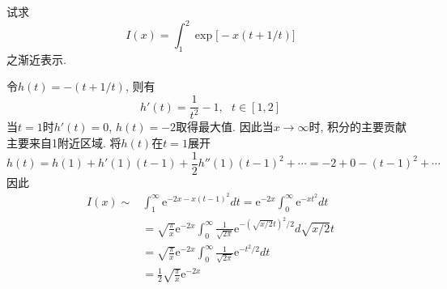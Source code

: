 \begin{problem}[习题2.5]
试求
\[
I(x)=\int_1^2\exp\Big[
-x(t+1/t)\Big]
\]
之渐近表示.
\end{problem}

\begin{solution}
令$h(t)=-(t+1/t)$, 则有
\[
h'(t)=\frac{1}{t^{2}}-1,\:\:\: t\in[1,2]
\]
当$t=1$时$h'(t)=0$, $h(t)=-2$取得最大值. 因此当$x\rightarrow\infty$时, 积分的主要贡献主要来自1附近区域.
将$h(t)$在$t=1$展开
\[
h(t)=h(1)+h'(1)(t-1)+\frac{1}{2}h''(1)(t-1)^{2}+\cdots=-2+0-(t-1)^{2}+\cdots
\]
因此
\begin{align*}
I(x)\sim & \int_{1}^{\infty}\mathrm{e}^{-2x-x(t-1)^{2}}dt=\mathrm{e}^{-2x}\int_{0}^{\infty}\mathrm{e}^{-xt^{2}}dt\\
 & =\sqrt{\frac{\pi}{x}}\mathrm{e}^{-2x}\int_{0}^{\infty}\frac{1}{\sqrt{2\pi}}\mathrm{e}^{-(\sqrt{x/2}t)^{2}/2}d\sqrt{x/2}t\\
 & =\sqrt{\frac{\pi}{x}}\mathrm{e}^{-2x}\int_{0}^{\infty}\frac{1}{\sqrt{2\pi}}\mathrm{e}^{-t^{2}/2}dt\\
 & =\frac{1}{2}\sqrt{\frac{\pi}{x}}\mathrm{e}^{-2x}
\end{align*}
\end{solution} 
